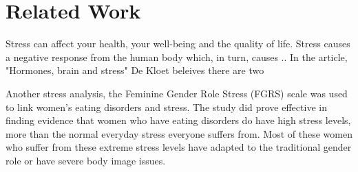 \section{Related Work}
\label{sec:Related-Work}

Stress can affect your health, your well-being and the quality of life. Stress causes a negative response from the human body which, in turn, causes .. In the article, "Hormones, brain and stress" De Kloet beleives there are two 

Another stress analysis, the Feminine Gender Role Stress (FGRS) scale was used to link women's eating disorders and stress. The study did prove effective in finding evidence that women who have eating disorders do have high stress levels, more than the normal everyday stress everyone suffers from. Most of these women who suffer from these extreme stress levels have adapted to the traditional gender role or have severe body image issues. 
